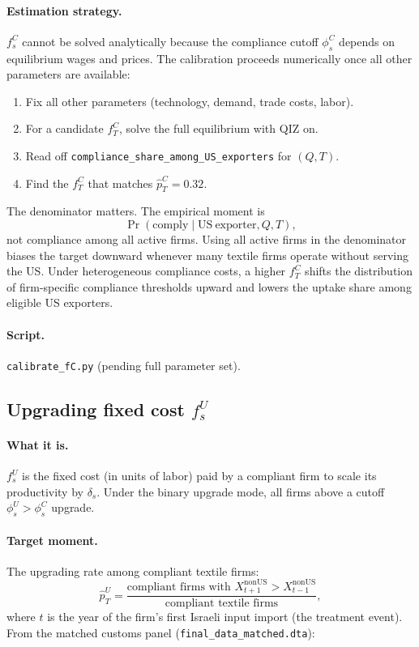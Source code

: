 \documentclass[12pt]{article}
\begin{document}
\paragraph{Estimation strategy.}
$f^C_s$ cannot be solved analytically because the compliance cutoff $\phi^C_s$
depends on equilibrium wages and prices. The calibration proceeds numerically
once all other parameters are available:
\begin{enumerate}
  \item Fix all other parameters (technology, demand, trade costs, labor).
  \item For a candidate $f^C_T$, solve the full equilibrium with QIZ on.
  \item Read off \texttt{compliance\_share\_among\_US\_exporters} for $(Q, T)$.
  \item Find the $f^C_T$ that matches $\hat p^C_T = 0.32$.
\end{enumerate}
The denominator matters. The empirical moment is
\[
\Pr(\mathrm{comply}\mid \mathrm{US\ exporter}, Q,T),
\]
not compliance among all active firms. Using all active firms in the
denominator biases the target downward whenever many textile firms operate
without serving the US. Under heterogeneous compliance costs, a higher
$f^C_T$ shifts the distribution of firm-specific compliance thresholds upward
and lowers the uptake share among eligible US exporters.

\paragraph{Script.} \texttt{calibrate\_fC.py} (pending full parameter set).

\subsection{Upgrading fixed cost $f^U_s$}

\paragraph{What it is.}
$f^U_s$ is the fixed cost (in units of labor) paid by a compliant firm to
scale its productivity by $\delta_s$. Under the binary upgrade mode, all
firms above a cutoff $\phi^U_s > \phi^C_s$ upgrade.

\paragraph{Target moment.}
The upgrading rate among compliant textile firms:
\[
\hat p^U_T = \frac{\text{compliant firms with }
X^{\mathrm{nonUS}}_{t+1} > X^{\mathrm{nonUS}}_{t-1}}
{\text{compliant textile firms}},
\]
where $t$ is the year of the firm's first Israeli input import
(the treatment event). From the matched customs panel
(\texttt{final\_data\_matched.dta}):
\end{document}
